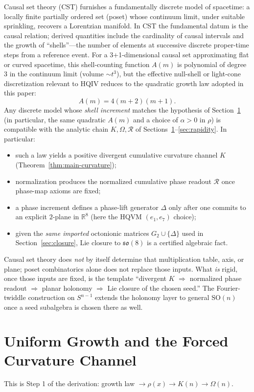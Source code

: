 \documentclass[11pt]{amsart}
\begin{document}
Causal set theory (CST) furnishes a fundamentally discrete model of spacetime: a locally finite partially ordered set (poset) whose continuum limit, under suitable sprinkling, recovers a Lorentzian manifold. In CST the fundamental datum is the causal relation; derived quantities include the cardinality of causal intervals and the growth of ``shells''---the number of elements at successive discrete proper-time steps from a reference event. For a 3+1-dimensional causal set approximating flat or curved spacetime, this shell-counting function \(A(m)\) is polynomial of degree 3 in the continuum limit (volume \(\sim t^3\)), but the effective null-shell or light-cone discretization relevant to HQIV reduces to the quadratic growth law adopted in this paper:
\[
A(m)=4(m+2)(m+1).
\]
Any discrete model whose \emph{shell increment} matches the hypothesis of Section~\ref{sec:growth} (in particular, the same quadratic \(A(m)\) and a choice of \(\alpha>0\) in \(\rho\)) is compatible with the analytic chain \(K,\Omega,\mathcal{R}\) of Sections~\ref{sec:growth}--\ref{sec:rapidity}. In particular:
\begin{itemize}
  \item such a law yields a positive divergent cumulative curvature channel \(K\) (Theorem~\ref{thm:main-curvature});
  \item normalization produces the normalized cumulative phase readout \(\mathcal{R}\) once phase-map axioms are fixed;
  \item a phase increment defines a phase-lift generator \(\Delta\) only after one commits to an explicit \(2\)-plane in \(\mathbb{R}^8\) (here the HQVM \((e_1,e_7)\) choice);
  \item given the \emph{same imported} octonionic matrices \(G_2\cup\{\Delta\}\) used in Section~\ref{sec:closure}, Lie closure to \(\mathfrak{so}(8)\) is a certified algebraic fact.
\end{itemize}
Causal set theory does \emph{not} by itself determine that multiplication table, axis, or plane; poset combinatorics alone does not replace those inputs. What \emph{is} rigid, once those inputs are fixed, is the template ``divergent \(K\) \(\Rightarrow\) normalized phase readout \(\Rightarrow\) planar holonomy \(\Rightarrow\) Lie closure of the chosen seed.'' The Fourier-twiddle construction on \(S^{n-1}\) extends the holonomy layer to general \(\mathrm{SO}(n)\) once a seed subalgebra is chosen there as well.

\section{Uniform Growth and the Forced Curvature Channel}
\label{sec:growth}
This is Step 1 of the derivation: growth law \(\to \rho(x)\to K(n)\to \Omega(n)\).
\end{document}
